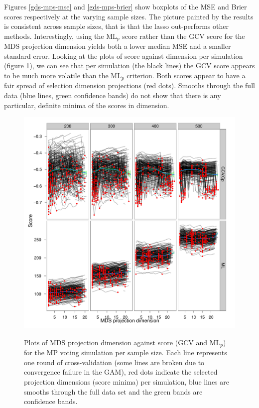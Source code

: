 Figures \ref{gds-mps-mse} and \ref{gds-mps-brier} show boxplots of the MSE and Brier scores respectively at the varying sample sizes. The picture painted by the results is consistent across sample sizes, that is that the lasso out-performs other methods. Interestingly, using the $\text{ML}_p$ score rather than the GCV score for the MDS projection dimension yields both a lower median MSE and a smaller standard error. Looking at the plots of score against dimension per simulation (figure \ref{gds-mps-dimselect}), we can see that per simulation (the black lines) the GCV score appears to be much more volatile than the $\text{ML}_p$ criterion. Both scores appear to have a fair spread of selection dimension projections (red dots). Smooths through the full data (blue lines, green confidence bands) do not show that there is any particular, definite minima of the scores in dimension.

\begin{figure}
\centering
\includegraphics[width=6in]{gds/figs/mps-dimselect.pdf} \\
\caption{Plots of MDS projection dimension against score (GCV and $\text{ML}_p$) for the MP voting simulation per sample size. Each line represents one round of cross-validation (some lines are broken due to convergence failure in the GAM), red dots indicate the selected projection dimensions (score minima) per simulation, blue lines are smooths through the full data set and the green bands are confidence bands.}
\label{gds-mps-dimselect}
\end{figure}


